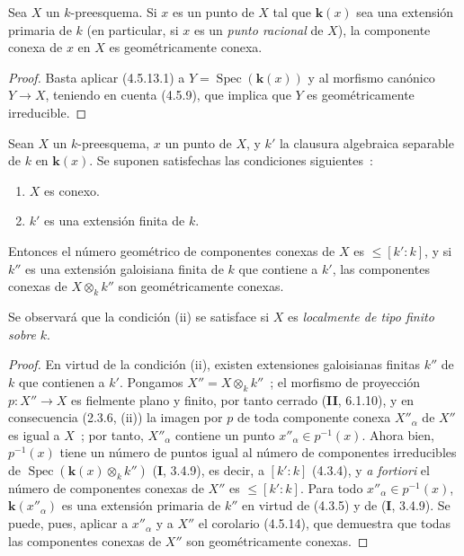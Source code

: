 \begin{corollary}[4.5.14]
\label{IV.2.4.5.14-fr}
Sea $X$ un $k$-preesquema. Si $x$ es un punto de $X$ tal que $\boldsymbol{k}(x)$ sea una
extensión primaria de $k$ \textup{(en particular, si $x$ es un \emph{punto racional} de $X$)},
la componente conexa de $x$ en $X$ es geométricamente conexa.
\end{corollary}

\begin{proof}
Basta aplicar (4.5.13.1) a $Y=\operatorname{Spec}(\boldsymbol{k}(x))$ y al morfismo
canónico $Y\to X$, teniendo en cuenta (4.5.9), que implica que $Y$ es
geométricamente irreducible.
\end{proof}

\begin{proposition}[4.5.15]
\label{IV.2.4.5.15-fr}
Sean $X$ un $k$-preesquema, $x$ un punto de $X$, y $k'$ la clausura algebraica
separable de $k$ en $\boldsymbol{k}(x)$. Se suponen satisfechas las condiciones siguientes~:
\begin{enumerate}
\item[\textup{(i)}] $X$ es conexo.
\item[\textup{(ii)}] $k'$ es una extensión finita de $k$.
\end{enumerate}
Entonces el número geométrico de componentes conexas de $X$ es
$\leqslant[k':k]$, y si $k''$ es una extensión galoisiana finita de $k$
que contiene a $k'$, las componentes conexas de $X\otimes_k k''$ son
geométricamente conexas.
\end{proposition}

Se observará que la condición (ii) se satisface si $X$ es \emph{localmente de
tipo finito sobre} $k$.

\begin{proof}
En virtud de la condición (ii), existen extensiones galoisianas finitas $k''$
de $k$ que contienen a $k'$. Pongamos $X''=X\otimes_k k''$~; el morfismo de
proyección $p:X''\to X$ es fielmente plano y finito, por tanto cerrado
(\textbf{II}, 6.1.10), y en consecuencia (2.3.6, (ii)) la imagen por $p$ de toda
componente conexa $X''_\alpha$ de $X''$ es igual a $X$~; por tanto,
$X''_\alpha$ contiene un punto $x''_\alpha\in p^{-1}(x)$. Ahora bien,
$p^{-1}(x)$ tiene un número de puntos igual al número de componentes
irreducibles de $\operatorname{Spec}(\boldsymbol{k}(x)\otimes_k k'')$ (\textbf I, 3.4.9), es decir,
a $[k':k]$ (4.3.4), y \emph{a fortiori} el número de componentes conexas de
$X''$ es $\leqslant[k':k]$. Para todo $x''_\alpha\in p^{-1}(x)$,
$\boldsymbol{k}(x''_\alpha)$ es una extensión primaria de $k''$ en virtud de (4.3.5) y de
(\textbf I, 3.4.9). Se puede, pues, aplicar a $x''_\alpha$ y a $X''$ el corolario
(4.5.14), que demuestra que todas las componentes conexas de $X''$ son
geométricamente conexas.
\end{proof}

